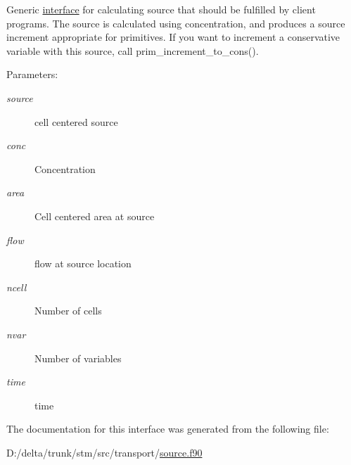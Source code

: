 Generic \hyperlink{a00002}{interface} for calculating source that should be fulfilled by client programs. The source is calculated using concentration, and produces a source increment appropriate for primitives. If you want to increment a conservative variable with this source, call prim\_\-increment\_\-to\_\-cons(). 

\begin{Desc}
\item[Parameters:]
\begin{description}
\item[{\em source}]cell centered source \item[{\em conc}]Concentration \item[{\em area}]Cell centered area at source \item[{\em flow}]flow at source location\item[{\em ncell}]Number of cells\item[{\em nvar}]Number of variables\item[{\em time}]time \end{description}
\end{Desc}


The documentation for this interface was generated from the following file:\begin{CompactItemize}
\item 
D:/delta/trunk/stm/src/transport/\hyperlink{a00019}{source.f90}\end{CompactItemize}
